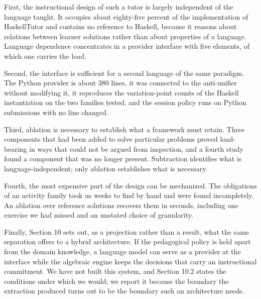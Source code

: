 \documentclass[10pt,twocolumn,letterpaper]{article}
\begin{document}
First, the instructional design of such a tutor is largely independent
of the language taught. It occupies about eighty-five percent of the
implementation of HaskellTutor and contains no reference to Haskell,
because it reasons about relations between learner solutions rather than
about properties of a language. Language dependence concentrates in a
provider interface with five elements, of which one carries the load.

Second, the interface is sufficient for a second language of the same
paradigm. The Python provider is about 380 lines, it was connected to the
anti-unifier without modifying it, it reproduces the variation-point
counts of the Haskell instantiation on the two families tested, and the
session policy runs on Python submissions with no line changed.

Third, ablation is necessary to establish what a framework must retain.
Three components that had been added to solve particular problems proved
load-bearing in ways that could not be argued from inspection, and a
fourth study found a component that was no longer present. Subtraction
identifies what is language-independent; only ablation establishes what
is necessary.

Fourth, the most expensive part of the design can be mechanized. The
obligations of an activity family took us weeks to find by hand and were
found incompletely. An ablation over reference solutions recovers them
in seconds, including one exercise we had missed and an unstated choice
of granularity.

Finally, Section 10 sets out, as a projection rather than a result, what the same separation offers to a hybrid architecture. If the pedagogical policy is held apart from the domain knowledge, a language model can serve as a provider at the interface while the algebraic engine keeps the decisions that carry an instructional commitment. We have not built this system, and Section 10.2 states the conditions under which we would; we report it because the boundary the extraction produced turns out to be the boundary such an architecture needs.
\end{document}
